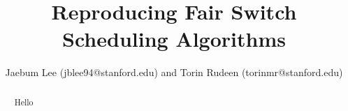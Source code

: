 \documentclass[sigconf]{acmart}
\begin{document}
\title{Reproducing Fair Switch Scheduling Algorithms}


\author{Jaebum Lee (jblee94@stanford.edu) and Torin Rudeen (torinmr@stanford.edu)}

\renewcommand{\shortauthors}{Lee \& Rudeen}

\begin{abstract}
    Hello
\end{abstract}

\maketitle





\end{document}
